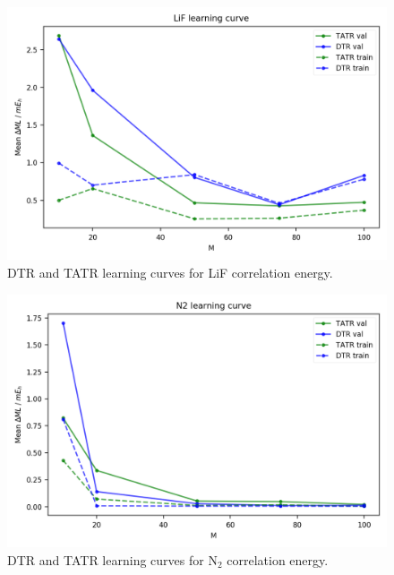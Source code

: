 \begin{figure}
    \centering
    \includegraphics[scale=1.0]{p2/figures/si/LiF_learn_e.png}
    \caption{DTR and TATR learning curves for LiF correlation energy.}
\end{figure}

\begin{figure}
    \centering
    \includegraphics[scale=1.0]{p2/figures/si/N2_learn_e.png}
    \caption{DTR and TATR learning curves for N$_2$ correlation energy.}
\end{figure}

